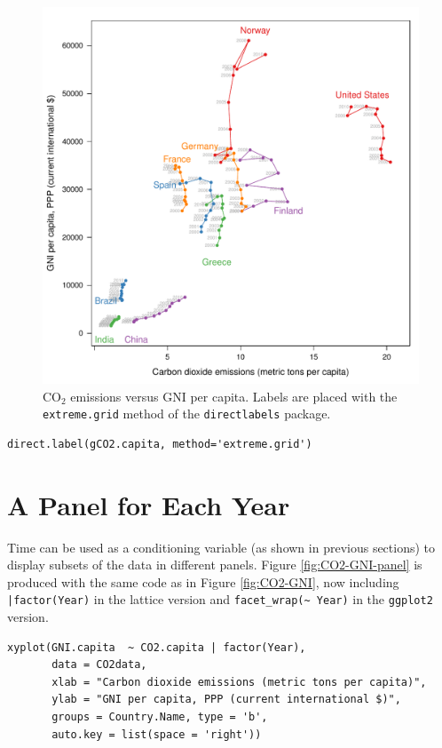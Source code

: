 \begin{figure}[htbp]
\centering
\includegraphics[width=.9\linewidth]{figs/CO2_capitaDL.pdf}
\caption{\(\mathrm{CO_2}\) emissions versus GNI per capita. Labels are placed with the \texttt{extreme.grid} method of the \texttt{directlabels} package. \label{fig:CO2-GNI-DL}}
\end{figure}

\lstset{language=r,label= ,caption= ,captionpos=b,numbers=none}
\begin{lstlisting}
direct.label(gCO2.capita, method='extreme.grid')
\end{lstlisting}

\section{A Panel for Each Year}
\label{sec:orgadb85f9}
Time can be used as a conditioning variable (as shown in previous
sections) to display subsets of the data in different panels. Figure
\ref{fig:CO2-GNI-panel} is produced with the same code as in Figure
\ref{fig:CO2-GNI}, now including \texttt{|factor(Year)} in the lattice
version and \texttt{facet\_wrap(\textasciitilde{} Year)} in the \texttt{ggplot2} version.

\lstset{language=r,label= ,caption= ,captionpos=b,numbers=none}
\begin{lstlisting}
xyplot(GNI.capita  ~ CO2.capita | factor(Year),
       data = CO2data,
       xlab = "Carbon dioxide emissions (metric tons per capita)",
       ylab = "GNI per capita, PPP (current international $)",
       groups = Country.Name, type = 'b',
       auto.key = list(space = 'right'))
\end{lstlisting}

